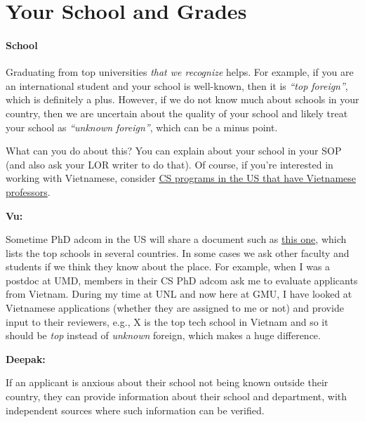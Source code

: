 \documentclass[oneside,11pt]{book}
\newenvironment{commentbox}[1][]{
  \small
  \begin{mybox}
    {\small \textbf{#1}}
  }{
  \end{mybox}
}
\begin{document}
\section{Your School and Grades}\label{sec:your-school}

\paragraph{School} Graduating from top universities \emph{that we recognize} helps. For example, if you are an international student and your school is well-known, then it is \emph{``top foreign''}, which is definitely a plus.
However, if we do not know much about schools in your country, then we are uncertain about the quality of your school and  likely treat your school as \emph{``unknown foreign''}, which can be a minus point.


What can you do about this? You can explain about your school in your SOP (and also ask your LOR writer to do that). Of course, if you're interested in working with Vietnamese, consider  \href{https://github.com/dynaroars/dynaroars.github.io/wiki/Viet-CS-Profs-US}{CS programs in the US that have Vietnamese professors}. %

\begin{commentbox}[Vu:]
  Sometime PhD adcom in the US will share a document such as \href{https://github.com/dynaroars/dynaroars.github.io/wiki/Foreign-Top-Schools}{this one}, which lists the top schools in several countries. In some cases we ask other faculty and students if we think they know about the place.  For example, when I was a postdoc at UMD, members in their CS PhD adcom ask me to evaluate applicants from Vietnam.  During my time at UNL and now here at GMU, I have looked at Vietnamese applications (whether they are assigned to me or not) and provide input to their reviewers, e.g., X is the top tech school in Vietnam and so it should be \emph{top} instead of \emph{unknown} foreign, which makes a huge difference.
\end{commentbox}
\begin{commentbox}[Deepak:] 
  If an applicant is anxious about their school not being known outside their country, they can provide information about their school and department, with independent sources where such information can be verified.
\end{commentbox}
\end{document}
